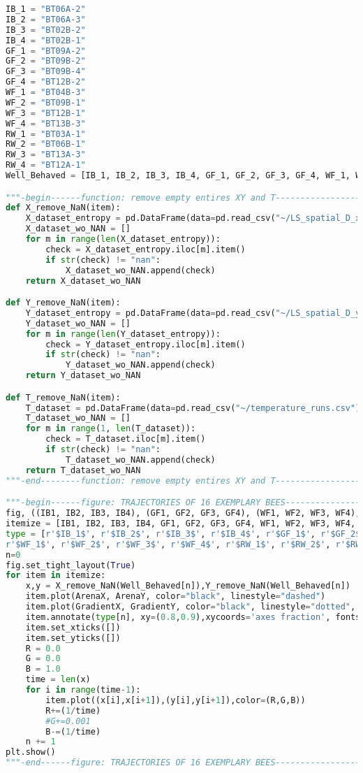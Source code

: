 \begin{lstlisting}[language=Python, basicstyle=\tiny, frame=single, keywordstyle=\color{teal}, commentstyle=\color{olive}, stringstyle=\color{red}]
IB_1 = "BT06A-2"
IB_2 = "BT06A-3"
IB_3 = "BT02B-2"
IB_4 = "BT02B-1"
GF_1 = "BT09A-2"
GF_2 = "BT09B-2"
GF_3 = "BT09B-4"
GF_4 = "BT12B-2"
WF_1 = "BT04B-3"
WF_2 = "BT09B-1"
WF_3 = "BT12B-1"
WF_4 = "BT13B-3"
RW_1 = "BT03A-1"
RW_2 = "BT06B-1"
RW_3 = "BT13A-3"
RW_4 = "BT12A-1"
Well_Behaved = [IB_1, IB_2, IB_3, IB_4, GF_1, GF_2, GF_3, GF_4, WF_1, WF_2, WF_3, WF_4, RW_1, RW_2, RW_3, RW_4]

"""-begin------function: remove empty entires XY and T-----------------------"""
def X_remove_NaN(item):
    X_dataset_entropy = pd.DataFrame(data=pd.read_csv("~/LS_spatial_D_x.csv"), columns=[item])
    X_dataset_wo_NAN = []
    for m in range(len(X_dataset_entropy)):
        check = X_dataset_entropy.iloc[m].item()
        if str(check) != "nan":
            X_dataset_wo_NAN.append(check)
    return X_dataset_wo_NAN

def Y_remove_NaN(item):
    Y_dataset_entropy = pd.DataFrame(data=pd.read_csv("~/LS_spatial_D_y.csv"), columns=[item])
    Y_dataset_wo_NAN = []
    for m in range(len(Y_dataset_entropy)):
        check = Y_dataset_entropy.iloc[m].item()
        if str(check) != "nan":
            Y_dataset_wo_NAN.append(check)
    return Y_dataset_wo_NAN

def T_remove_NaN(item):
    T_dataset = pd.DataFrame(data=pd.read_csv("~/temperature_runs.csv"), columns=[item])
    T_dataset_wo_NAN = []
    for m in range(1, len(T_dataset)):
        check = T_dataset.iloc[m].item()
        if str(check) != "nan":
            T_dataset_wo_NAN.append(check)
    return T_dataset_wo_NAN
"""-end--------function: remove empty entires XY and T-----------------------"""

"""-begin------figure: TRAJECTORIES OF 16 EXEMPLARY BEES---------------------"""
fig, ((IB1, IB2, IB3, IB4), (GF1, GF2, GF3, GF4), (WF1, WF2, WF3, WF4), (RW1, RW2, RW3, RW4)) = plt.subplots(4, 4, figsize=(10,10))
itemize = [IB1, IB2, IB3, IB4, GF1, GF2, GF3, GF4, WF1, WF2, WF3, WF4, RW1, RW2, RW3, RW4]
type = [r'$IB_1$', r'$IB_2$', r'$IB_3$', r'$IB_4$', r'$GF_1$', r'$GF_2$', r'$GF_3$', r'$GF_4$', 
r'$WF_1$', r'$WF_2$', r'$WF_3$', r'$WF_4$', r'$RW_1$', r'$RW_2$', r'$RW_3$', r'$RW_4$']
n=0
fig.set_tight_layout(True)
for item in itemize:
    x,y = X_remove_NaN(Well_Behaved[n]),Y_remove_NaN(Well_Behaved[n])
    item.plot(ArenaX, ArenaY, color="black", linestyle="dashed")
    item.plot(GradientX, GradientY, color="black", linestyle="dotted", dash_capstyle='round')
    item.annotate(type[n], xy=(0.8,0.9),xycoords='axes fraction', fontsize=12)
    item.set_xticks([])
    item.set_yticks([])
    R = 0.0
    G = 0.0
    B = 1.0
    time = len(x)
    for i in range(time-1):
        item.plot((x[i],x[i+1]),(y[i],y[i+1]),color=(R,G,B))
        R+=(1/time)
        #G+=0.001
        B-=(1/time)
    n += 1
plt.show()
"""-end------figure: TRAJECTORIES OF 16 EXEMPLARY BEES-----------------------"""


\end{lstlisting}
